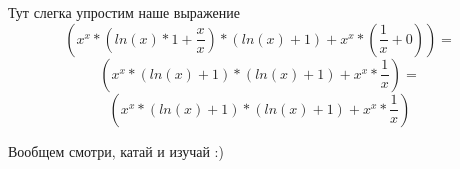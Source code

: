 \documentclass[a4paper,12pt]{article}
\begin{document}
Тут слегка упростим наше выражение
\begin{equation}
\left( {{{{x }^ {x }}* {\left( {{ln \left( {x }\right) }* {1 }}+ {\frac{{x }}{{x }}}\right) }}* {\left( {ln \left( {x }\right) }+ {1 }\right) }}+ {{{x }^ {x }}* {\left( {\frac{{1 }}{{x }}}+ {0 }\right) }}\right) =
\end{equation}
\begin{equation}
\left( {{{{x }^ {x }}* {\left( {ln \left( {x }\right) }+ {1 }\right) }}* {\left( {ln \left( {x }\right) }+ {1 }\right) }}+ {{{x }^ {x }}* {\frac{{1 }}{{x }}}}\right) =
\end{equation}
\begin{equation}
\left( {{{{x }^ {x }}* {\left( {ln \left( {x }\right) }+ {1 }\right) }}* {\left( {ln \left( {x }\right) }+ {1 }\right) }}+ {{{x }^ {x }}* {\frac{{1 }}{{x }}}}\right) 
\end{equation}

Вообщем смотри, катай и изучай :)
\end{document}
